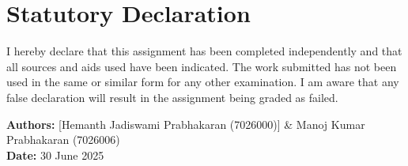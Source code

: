 \chapter*{Statutory Declaration}

I hereby declare that this assignment has been completed independently and that all sources and aids used have been indicated. The work submitted has not been used in the same or similar form for any other examination. I am aware that any false declaration will result in the assignment being graded as failed.

\vspace{2cm}

\textbf{Authors:} [Hemanth Jadiswami Prabhakaran (7026000)] \& Manoj Kumar Prabhakaran (7026006)\\[0.5cm]
\textbf{Date:} 30 June 2025\\[1cm]
